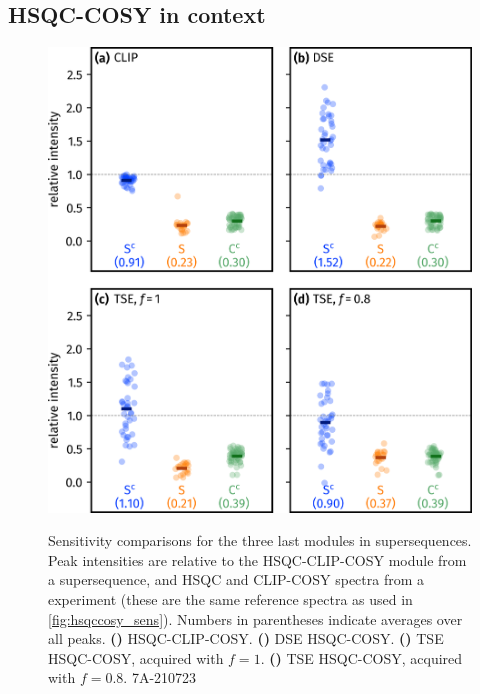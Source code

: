 \documentclass[a4paper,12pt]{article}
\begin{document}
\begin{refsection}
\section{HSQC-COSY in context}

\begin{figure}[!ht]
    \centering
    \includegraphics[]{hsqccosy_sens_with_hmbc.png}%
    {\label{fig:hsqccosy_sens_with_hmbc_clip}}%
    {\label{fig:hsqccosy_sens_with_hmbc_dse}}%
    {\label{fig:hsqccosy_sens_with_hmbc_tse_1}}%
    {\label{fig:hsqccosy_sens_with_hmbc_tse_0p8}}%
    \caption[Sensitivity comparisons for  supersequences]{
        Sensitivity comparisons for the three last modules in  supersequences.
        Peak intensities are relative to the HSQC-CLIP-COSY module from a  supersequence, and HSQC and CLIP-COSY spectra from a  experiment (these are the same reference spectra as used in \cref{fig:hsqccosy_sens}).
        Numbers in parentheses indicate averages over all peaks.
        \textbf{()} HSQC-CLIP-COSY.
        \textbf{()} DSE HSQC-COSY.
        \textbf{()} TSE HSQC-COSY, acquired with $f = 1$.
        \textbf{()} TSE HSQC-COSY, acquired with $f = 0.8$.
        7A-210723
    }
    \label{fig:hsqccosy_sens_with_hmbc}
\end{figure}


\end{refsection}
\end{document}
